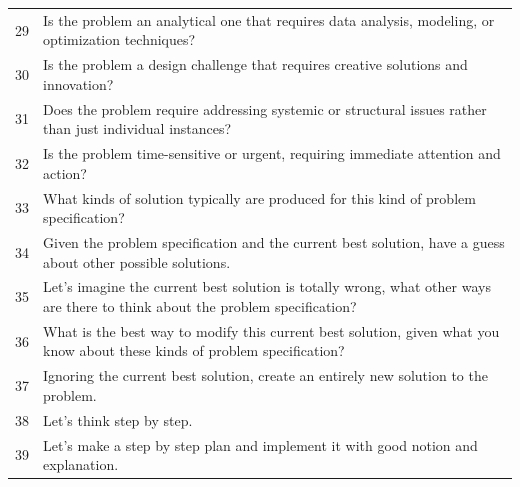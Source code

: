 \documentclass{article} %
\begin{document}
\begin{longtable}{p{1cm}p{10cm}}
29 & Is the problem an analytical one that requires data analysis, modeling, or optimization techniques?\\
30 & Is the problem a design challenge that requires creative solutions and innovation?\\
31 & Does the problem require addressing systemic or structural issues rather than just individual instances?\\
32 & Is the problem time-sensitive or urgent, requiring immediate attention and action?\\
33 & What kinds of solution typically are produced for this kind of problem specification?\\
34 & Given the problem specification and the current best solution, have a guess about other possible solutions.\\
35 & Let's imagine the current best solution is totally wrong, what other ways are there to think about the problem specification?\\
36 & What is the best way to modify this current best solution, given what you know about these kinds of problem specification?\\
37 & Ignoring the current best solution, create an entirely new solution to the problem.\\
38 & Let's think step by step. \\
39 & Let's make a step by step plan and implement it with good notion and explanation. \\
\bottomrule
\end{longtable}
\end{document}
